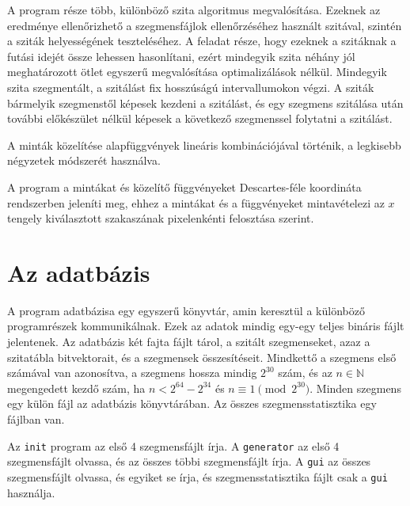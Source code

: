 A program része több, különböző szita algoritmus megvalósítása.
Ezeknek az eredménye ellenőrizhető a szegmensfájlok ellenőrzéséhez használt szitával, szintén a sziták helyességének teszteléséhez.
A feladat része, hogy ezeknek a szitáknak a futási idejét össze lehessen hasonlítani, ezért mindegyik szita néhány jól meghatározott ötlet egyszerű megvalósítása optimalizálások nélkül.
Mindegyik szita szegmentált, a szitálást fix hosszúságú intervallumokon végzi.
A sziták bármelyik szegmenstől képesek kezdeni a szitálást, és egy szegmens szitálása után további előkészület nélkül képesek a következő szegmenssel folytatni a szitálást.

A minták közelítése alapfüggvények lineáris kombinációjával történik, a legkisebb négyzetek módszerét használva.

A program a mintákat és közelítő függvényeket Descartes-féle koordináta rendszerben jeleníti meg, ehhez a mintákat és a függvényeket mintavételezi az $x$ tengely kiválasztott szakaszának pixelenkénti felosztása szerint.

\section{Az adatbázis}

A program adatbázisa egy egyszerű könyvtár, amin keresztül a különböző programrészek kommunikálnak.
Ezek az adatok mindig egy-egy teljes bináris fájlt jelentenek.
Az adatbázis két fajta fájlt tárol, a szitált szegmenseket, azaz a szitatábla bitvektorait, és a szegmensek összesítéseit.
Mindkettő a szegmens első számával van azonosítva, a szegmens hossza mindig $2^{30}$ szám, és az $n \in \mathbb{N}$ megengedett kezdő szám, ha $n < 2^{64}-2^{34}$ és $n \equiv 1 \pmod{2^{30}}$.
Minden szegmens egy külön fájl az adatbázis könyvtárában.
Az összes szegmensstatisztika egy fájlban van.

Az \texttt{init} program az első 4 szegmensfájlt írja.
A \texttt{generator} az első 4 szegmensfájlt olvassa, és az összes többi szegmensfájlt írja.
A \texttt{gui} az összes szegmensfájlt olvassa, és egyiket se írja, és szegmensstatisztika fájlt csak a \texttt{gui} használja.

